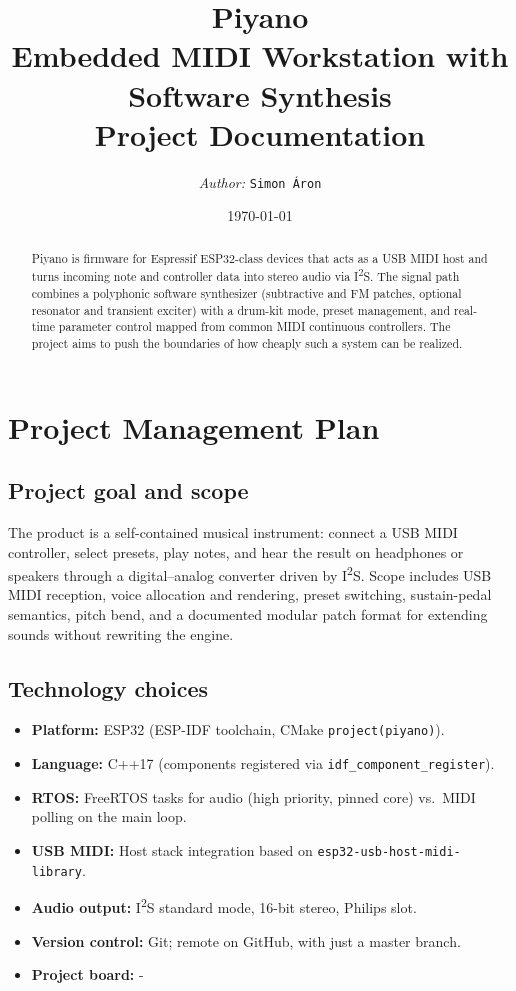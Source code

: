 \documentclass[11pt,a4paper]{article}
\title{Piyano\\[0.35em]
  \large Embedded MIDI Workstation with Software Synthesis\\
  \normalsize Project Documentation}
\author{%
  \textit{Author: } \texttt{Simon Áron}\\
  }
\date{\today}
\begin{document}
\maketitle

\begin{abstract}
Piyano is firmware for Espressif ESP32-class devices that acts as a USB MIDI host and turns incoming note and controller data into stereo audio via I\textsuperscript{2}S. The signal path combines a polyphonic software synthesizer (subtractive and FM patches, optional resonator and transient exciter) with a drum-kit mode, preset management, and real-time parameter control mapped from common MIDI continuous controllers. The project aims to push the boundaries of how cheaply such a system can be realized.
\end{abstract}
\pagebreak
\tableofcontents
\newpage

\section{Project Management Plan}

\subsection{Project goal and scope}
The product is a self-contained musical instrument: connect a USB MIDI controller, select presets, play notes, and hear the result on headphones or speakers through a digital--analog converter driven by I\textsuperscript{2}S. Scope includes USB MIDI reception, voice allocation and rendering, preset switching, sustain-pedal semantics, pitch bend, and a documented modular patch format for extending sounds without rewriting the engine.

\subsection{Technology choices}
\begin{itemize}[noitemsep]
  \item \textbf{Platform:} ESP32 (ESP-IDF toolchain, CMake \texttt{project(piyano)}).
  \item \textbf{Language:} C++17 (components registered via \texttt{idf\_component\_register}).
  \item \textbf{RTOS:} FreeRTOS tasks for audio (high priority, pinned core) vs.\ MIDI polling on the main loop.
  \item \textbf{USB MIDI:} Host stack integration based on \texttt{esp32-usb-host-midi-library}.
  \item \textbf{Audio output:} I\textsuperscript{2}S standard mode, 16-bit stereo, Philips slot.
  \item \textbf{Version control:} Git; remote on GitHub, with just a master branch.
  \item \textbf{Project board:} -
\end{itemize}
\end{document}

